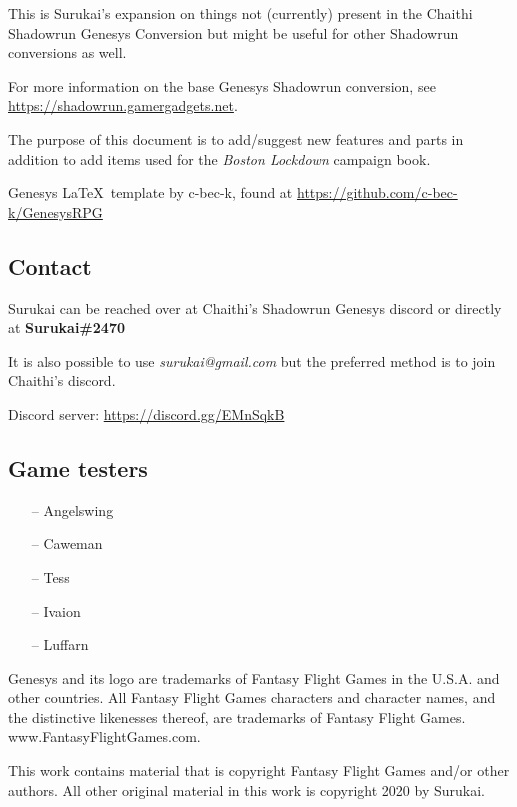 \documentclass{book}
\begin{document}
\begin{multicols}{2}
This is Surukai's expansion on things not (currently) present in the Chaithi Shadowrun Genesys Conversion but might be useful for other Shadowrun conversions as well.

For more information on the base Genesys Shadowrun conversion, see \url{https://shadowrun.gamergadgets.net}. 

The purpose of this document is to add/suggest new features and parts in addition to add items used for the \textit{Boston Lockdown} campaign book.

Genesys \LaTeX\ template by c-bec-k, found at \url{https://github.com/c-bec-k/GenesysRPG}

\subsection{Contact}
Surukai can be reached over at Chaithi's Shadowrun Genesys discord or directly at \textbf{Surukai\#2470} 

It is also possible to use \textit{surukai@gmail.com} but the preferred method is to join Chaithi's discord. 

Discord server: \url{https://discord.gg/EMnSqkB}

\subsection{Game testers}
\begin{itemize}[noitemsep]
	\item[--] Angelswing
	\item[--] Caweman
	\item[--] Tess
	\item[--] Ivaion
	\item[--] Luffarn
\end{itemize}



\end{multicols}

\vfill

\small Genesys and its logo are trademarks of Fantasy Flight Games in the U.S.A. and other countries. All Fantasy Flight Games characters and character names, and the distinctive likenesses thereof, are trademarks of Fantasy Flight Games. www.FantasyFlightGames.com.

\small This work contains material that is copyright Fantasy Flight Games and/or other authors. All other original material in this work is copyright 2020 by Surukai.
\end{document}
